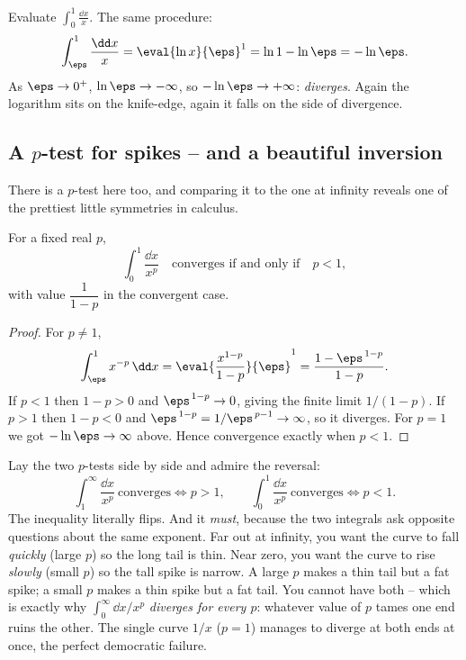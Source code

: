 \begin{example}
\label{ch25:ex-recip}
Evaluate $\displaystyle\int_0^{1}\frac{\dd x}{x}$. The same procedure:
\[
  \int_{\eps}^{1}\frac{\dd x}{x} = \eval{\ln x}{\eps}^{1}
  = \ln 1 - \ln\eps = -\ln\eps.
\]
As $\eps\to 0^+$, $\ln\eps\to -\infty$, so $-\ln\eps\to+\infty$: \emph{diverges}.
Again the logarithm sits on the knife-edge, again it falls on the side of
divergence.
\end{example}

\subsection{A $p$-test for spikes -- and a beautiful inversion}
\label{ch25:p-test-zero}

There is a $p$-test here too, and comparing it to the one at infinity reveals one
of the prettiest little symmetries in calculus.

\begin{theorem}
\label{ch25:thm-p-zero}
For a fixed real $p$,
\[
  \int_0^{1} \frac{\dd x}{x^{p}}
  \quad\text{converges if and only if}\quad p < 1,
\]
with value $\dfrac{1}{1-p}$ in the convergent case.
\end{theorem}

\begin{proof}
For $p\ne 1$,
\[
  \int_{\eps}^{1} x^{-p}\,\dd x
  = \eval{\frac{x^{1-p}}{1-p}}{\eps}^{1}
  = \frac{1 - \eps^{\,1-p}}{1-p}.
\]
If $p < 1$ then $1-p > 0$ and $\eps^{\,1-p}\to 0$, giving the finite limit
$1/(1-p)$. If $p > 1$ then $1-p < 0$ and $\eps^{\,1-p} = 1/\eps^{\,p-1}\to\infty$,
so it diverges. For $p=1$ we got $-\ln\eps\to\infty$ above. Hence convergence
exactly when $p<1$.
\end{proof}

\begin{aestheticbox}
Lay the two $p$-tests side by side and admire the reversal:
\[
  \int_1^{\infty}\frac{\dd x}{x^p}\ \text{converges} \iff p > 1,
  \qquad
  \int_0^{1}\frac{\dd x}{x^p}\ \text{converges} \iff p < 1.
\]
The inequality literally flips. And it \emph{must}, because the two integrals ask
opposite questions about the same exponent. Far out at infinity, you want the
curve to fall \emph{quickly} (large $p$) so the long tail is thin. Near zero, you
want the curve to rise \emph{slowly} (small $p$) so the tall spike is narrow.
A large $p$ makes a thin tail but a fat spike; a small $p$ makes a thin spike but a
fat tail. You cannot have both -- which is exactly why $\int_0^\infty \dd x/x^p$
\emph{diverges for every $p$}: whatever value of $p$ tames one end ruins the
other. The single curve $1/x$ ($p=1$) manages to diverge at both ends at once, the
perfect democratic failure.
\end{aestheticbox}

